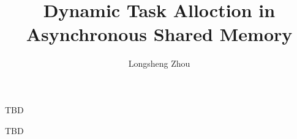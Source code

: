 \documentclass{ucalgthes1}
\title{Dynamic Task Alloction in Asynchronous Shared Memory}
\author{Longsheng Zhou}
\begin{document}

\makethesistitle
{}     %
\setcounter{page}{1}

\newpage
{}
{}
TBD


\newpage
{}
{}
TBD

\begin{singlespace}
\newpage
{}
\tableofcontents
\pagestyle{plain}
\newpage
{}
\pagestyle{plain}
\newpage
{}
\pagestyle{plain}
\clearpage
\clearpage          %
\end{singlespace}
\newpage
{}
\pagestyle{plain}
\clearpage







%
\def\newblock{\hskip .11em plus .33em minus .07em} %

\end{document}
